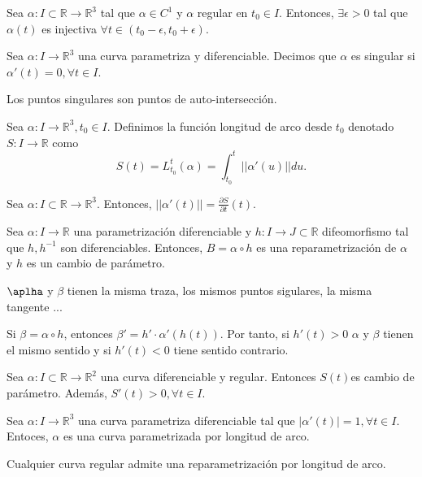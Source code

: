 \begin{lem}
  Sea $\alpha  : I \subset \mathbb{R} \to \mathbb{R}^{3}$ tal que $\alpha \in C^{1}$ y $\alpha$ regular en $t_{0} \in I$. Entonces, $\exists \epsilon > 0$ tal que $\alpha(t)$ es injectiva $\forall t \in (t_{0} - \epsilon, t_{0} + \epsilon)$.
\end{lem}

\begin{defn}
  Sea $\alpha: I \to \mathbb{R}^{3}$ una curva parametriza y diferenciable. Decimos que $\alpha$ es singular si $\alpha'(t) = 0, \forall t \in I$.
\end{defn}

\begin{obs}
  Los puntos singulares son puntos de auto-intersección.
\end{obs}

\begin{defn}
  Sea $\alpha : I \to \mathbb{R}^{3}, t_{0} \in I$. Definimos la función longitud de arco desde $t_{0}$ denotado $S: I \to \mathbb{R}$ como
  \[ 
    S(t) = L_{t_{0}}^{t}(\alpha) = \int_{t_{0}}^{t}  ||\alpha ' (u)|| du. 
  \] 
\end{defn}

\begin{lem}
  Sea $\alpha  : I \subset \mathbb{R} \to \mathbb{R}^{3}$. Entonces, $||\alpha'(t)|| = \frac{\partial{S}}{\partial{t}}(t)$.
\end{lem}

\begin{defn}[Reparametrización]
  Sea $\alpha: I \to \mathbb{R}$ una parametrización diferenciable y $h: I \to J \subset \mathbb{R}$ difeomorfismo tal que $h, h^{-1}$ son diferenciables. Entonces, $B = \alpha \circ h$ es una reparametrización de $\alpha$ y $h$ es un cambio de parámetro.
\end{defn}

\begin{obs}
  $\aplha$  y $\beta$ tienen la misma traza, los mismos puntos sigulares, la misma tangente ...
\end{obs}

\begin{obs}
  Si $\beta = \alpha \circ h$, entonces $\beta' = h' \cdot \alpha'(h(t))$. Por tanto, si $h'(t) > 0$ $\alpha$ y $\beta$ tienen el mismo sentido y si $h'(t)<0$ tiene sentido contrario.
\end{obs}

\begin{lem}
  Sea $\alpha : I \subset \mathbb{R} \to \mathbb{R}^{2}$ una curva diferenciable y regular. Entonces $S(t)$es cambio de parámetro. Además, $S'(t)>0, \forall t \in I$.
\end{lem}

\begin{defn}
  Sea $\alpha: I \to \mathbb{R}^{3}$ una curva parametriza diferenciable tal que $ |\alpha ' (t)| = 1, \forall t \in I$. Entoces, $\alpha$ es una curva parametrizada por longitud de arco.
\end{defn}

\begin{prop}
  Cualquier curva regular admite una reparametrización por longitud de arco.
\end{prop}
